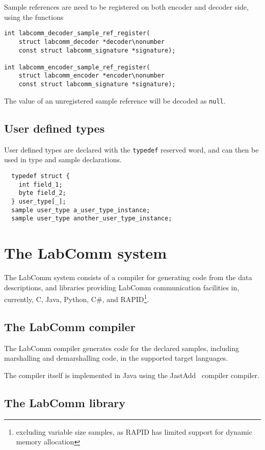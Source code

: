 \documentclass[a4paper]{article}
\begin{document}
Sample references are need to be registered on both encoder and decoder
side, using the functions

\begin{verbatim}
int labcomm_decoder_sample_ref_register(
    struct labcomm_decoder *decoder\nonumber
    const struct labcomm_signature *signature);

int labcomm_encoder_sample_ref_register(
    struct labcomm_encoder *encoder\nonumber
    const struct labcomm_signature *signature);
\end{verbatim}

The value of an unregistered sample reference will be decoded as \verb+null+.

\subsection{User defined types}

User defined types are declared with the \verb+typedef+ reserved word,
and can then be used in type and sample declarations.

\begin{verbatim}
  typedef struct {
    int field_1;
    byte field_2;
  } user_type[_];
  sample user_type a_user_type_instance;
  sample user_type another_user_type_instance;
\end{verbatim}

\section{The LabComm system}

The LabComm system consists of a compiler for generating code from the data
descriptions, and libraries providing LabComm communication facilities in,
currently, C, Java, Python, C\#, and RAPID\footnote{excluding variable
size samples, as RAPID has limited support for dynamic memory allocation}.


\subsection{The LabComm compiler}

The LabComm compiler generates code for the declared samples, including marshalling and
demarshalling code, in the supported target languages.

The compiler itself is implemented in Java using the JastAdd~\cite{jastadd} compiler compiler.

\subsection{The LabComm library}
\end{document}
